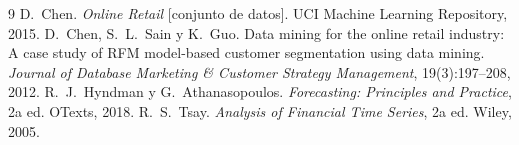 \documentclass[11pt,letterpaper]{article}
\begin{document}
\begin{thebibliography}{9}
 D.~Chen. \emph{Online Retail} [conjunto de datos]. UCI Machine Learning Repository, 2015.
 D.~Chen, S.~L.~Sain y K.~Guo. Data mining for the online retail industry: A case study of RFM model-based customer segmentation using data mining. \emph{Journal of Database Marketing \& Customer Strategy Management}, 19(3):197--208, 2012.
 R.~J.~Hyndman y G.~Athanasopoulos. \emph{Forecasting: Principles and Practice}, 2a ed. OTexts, 2018.
 R.~S.~Tsay. \emph{Analysis of Financial Time Series}, 2a ed. Wiley, 2005.
\end{thebibliography}
\end{document}
